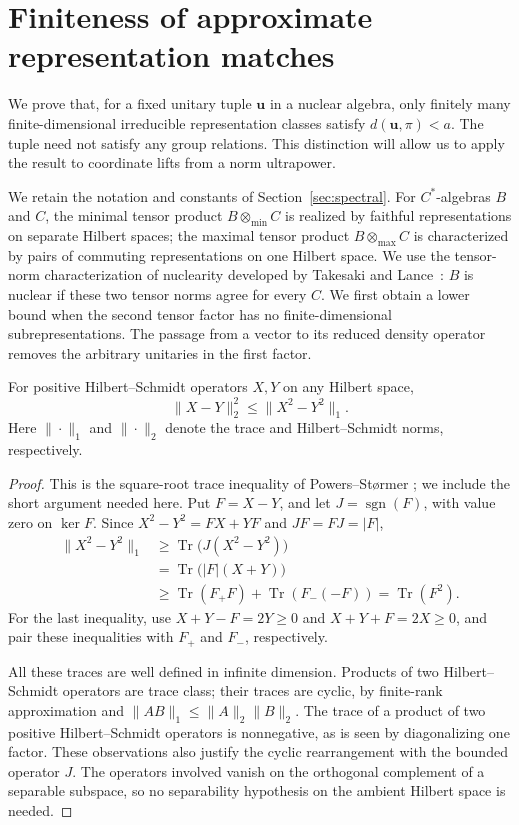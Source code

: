 \section{Finiteness of approximate representation matches}
\label{sec:nuclear}

We prove that, for a fixed unitary tuple $\mathbf u$ in a nuclear algebra,
only finitely many finite-dimensional irreducible representation classes
satisfy $d(\mathbf u,\pi)<a$.
The tuple need not satisfy any group relations. This distinction will allow
us to apply the result to coordinate lifts from a norm ultrapower.

We retain the notation and constants of Section~\ref{sec:spectral}.
For $C^*$-algebras $B$ and $C$, the minimal tensor product
$B\otimes_{\min}C$ is realized by faithful representations on separate
Hilbert spaces; the maximal tensor product $B\otimes_{\max}C$ is
characterized by pairs of commuting representations on one Hilbert space.
We use the tensor-norm characterization of nuclearity developed by
Takesaki and Lance~\cite{Takesaki1964,Lance1973}: $B$ is nuclear if
these two tensor norms agree for every $C$.
We first obtain a lower bound when the second tensor factor has no
finite-dimensional subrepresentations. The passage from a vector to its
reduced density operator removes the arbitrary unitaries in the first
factor.

\begin{lemma}\label{lem:square-root-trace}
For positive Hilbert--Schmidt operators $X,Y$ on any Hilbert space,
\[
 \|X-Y\|_2^2\leq\|X^2-Y^2\|_1.
\]
Here $\|\cdot\|_1$ and $\|\cdot\|_2$ denote the trace and
Hilbert--Schmidt norms, respectively.
\end{lemma}

\begin{proof}
This is the square-root trace inequality of Powers--St\o rmer
\cite[Lemma~4.1]{PowersStormer1970};
we include the short argument needed here.
Put $F=X-Y$, and let $J=\operatorname{sgn}(F)$, with value zero on
$\ker F$. Since $X^2-Y^2=FX+YF$ and $JF=FJ=|F|$,
\begin{align*}
 \|X^2-Y^2\|_1
 &\geq \operatorname{Tr}\bigl(J(X^2-Y^2)\bigr)\\
 &=\operatorname{Tr}\bigl(|F|(X+Y)\bigr)\\
 &\geq\operatorname{Tr}(F_+F)+\operatorname{Tr}(F_-(-F))
 =\operatorname{Tr}(F^2).
\end{align*}
For the last inequality, use $X+Y-F=2Y\geq0$ and
$X+Y+F=2X\geq0$, and pair these inequalities with $F_+$ and $F_-$,
respectively.

All these traces are well defined in infinite dimension. Products of two
Hilbert--Schmidt operators are trace class; their traces are cyclic, by
finite-rank approximation and
$\|AB\|_1\leq\|A\|_2\|B\|_2$.
The trace of a product of two positive Hilbert--Schmidt operators is
nonnegative, as is seen by diagonalizing one factor. These observations
also justify the cyclic rearrangement with the bounded operator $J$.
The operators involved vanish on the orthogonal complement of a separable
subspace, so no separability hypothesis on the ambient Hilbert space is
needed.
\end{proof}

